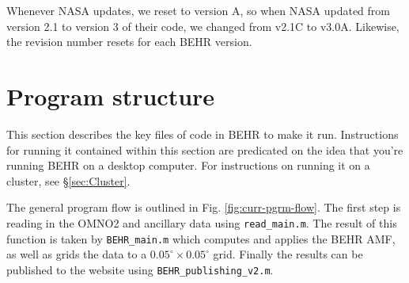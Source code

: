 \documentclass[12pt]{article}
\begin{document}
	Whenever NASA updates, we reset to version A, so when NASA updated from version 2.1 to version 3 of their code, we changed from v2.1C to v3.0A.  Likewise, the revision number resets for each BEHR version.

\section{Program structure}
	This section describes the key files of code in BEHR to make it run.  Instructions for running it contained within this section are predicated on the idea that you're running BEHR on a desktop computer.  For instructions on running it on a cluster, see \S\ref{sec:Cluster}.
	
	The general program flow is outlined in Fig. \ref{fig:curr-pgrm-flow}. The first step is reading in the OMNO2 and ancillary data using \lstinline$read_main.m$. The result of this function is taken by \lstinline$BEHR_main.m$ which computes and applies the BEHR AMF, as well as grids the data to a $0.05^\circ \times 0.05^\circ$ grid. Finally the results can be published to the website using \lstinline$BEHR_publishing_v2.m$.
\end{document}
